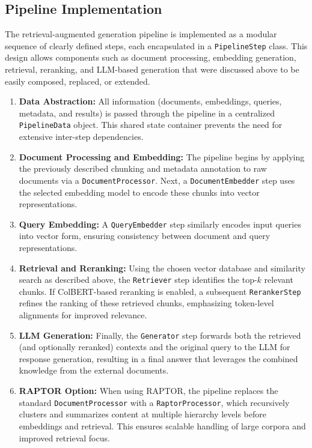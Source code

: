 \documentclass{scrartcl}
\begin{document}
\subsection{Pipeline Implementation}

The retrieval-augmented generation pipeline is implemented as a modular sequence of clearly defined steps, each encapsulated in a \texttt{PipelineStep} class. This design allows components such as document processing, embedding generation, retrieval, reranking, and LLM-based generation that were discussed above to be easily composed, replaced, or extended.

\begin{enumerate}
    \item \textbf{Data Abstraction:} All information (documents, embeddings, queries, metadata, and results) is passed through the pipeline in a centralized \texttt{PipelineData} object. This shared state container prevents the need for extensive inter-step dependencies.

    \item \textbf{Document Processing and Embedding:} The pipeline begins by applying the previously described chunking and metadata annotation to raw documents via a \texttt{DocumentProcessor}. Next, a \texttt{DocumentEmbedder} step uses the selected embedding model to encode these chunks into vector representations.

    \item \textbf{Query Embedding:} A \texttt{QueryEmbedder} step similarly encodes input queries into vector form, ensuring consistency between document and query representations.

    \item \textbf{Retrieval and Reranking:} Using the chosen vector database and similarity search as described above, the \texttt{Retriever} step identifies the top-$k$ relevant chunks. If ColBERT-based reranking is enabled, a subsequent \texttt{RerankerStep} refines the ranking of these retrieved chunks, emphasizing token-level alignments for improved relevance.

    \item \textbf{LLM Generation:} Finally, the \texttt{Generator} step forwards both the retrieved (and optionally reranked) contexts and the original query to the LLM for response generation, resulting in a final answer that leverages the combined knowledge from the external documents.

    \item \textbf{RAPTOR Option:} When using RAPTOR, the pipeline replaces the standard \texttt{DocumentProcessor} with a \texttt{RaptorProcessor}, which recursively clusters and summarizes content at multiple hierarchy levels before embeddings and retrieval. This ensures scalable handling of large corpora and improved retrieval focus.

\end{enumerate}
\end{document}
